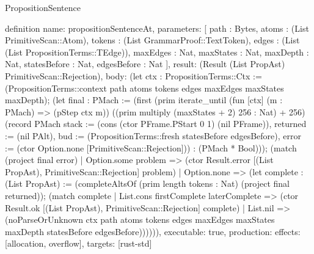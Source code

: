 \begin{lexlean}{PropositionSentence}
\begin{semanticmodule}
definition{
  name: propositionSentenceAt,
  parameters: [
    path : Bytes,
    atoms : (List PrimitiveScan::Atom),
    tokens : (List GrammarProof::TextToken),
    edges : (List (List PropositionTerms::TEdge)),
    maxEdges : Nat,
    maxStates : Nat,
    maxDepth : Nat,
    statesBefore : Nat,
    edgesBefore : Nat
  ],
  result: (Result (List PropAst) PrimitiveScan::Rejection),
  body: (let ctx : PropositionTerms::Ctx := (PropositionTerms::context path atoms tokens edges maxEdges maxStates maxDepth); (let final : PMach := (first (prim iterate_until (fun [ctx] (m : PMach) => (pStep ctx m)) ((prim multiply (maxStates + 2) 256 : Nat) + 256) (record PMach {stack := (cons (ctor PFrame.PStart 0 1) (nil PFrame)), returned := (nil PAlt), bud := (PropositionTerms::fresh statesBefore edgesBefore), error := (ctor Option.none [PrimitiveScan::Rejection])}) : (PMach * Bool))); (match (project final error)
    | Option.some problem => (ctor Result.error [(List PropAst), PrimitiveScan::Rejection] problem)
    | Option.none => (let complete : (List PropAst) := (completeAltsOf (prim length tokens : Nat) (project final returned)); (match complete
        | List.cons firstComplete laterComplete => (ctor Result.ok [(List PropAst), PrimitiveScan::Rejection] complete)
        | List.nil => (noParseOrUnknown ctx path atoms tokens edges maxEdges maxStates maxDepth statesBefore edgesBefore)))))),
  executable: true,
  production: {effects: [allocation, overflow], targets: [rust-std]}
}
\end{semanticmodule}
\end{lexlean}
